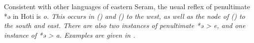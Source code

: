 
Consistent with other languages of eastern Seram,
the usual reflex of penultimate *ə in Hoti is \it{o}.
This occurs in  ()
and  () to the west,
as well as the  node of 
() to the south and east.
There are also two instances of penultimate *ə > \it{e},
and one instance of *ə > \it{a}.
Examples are given in .

